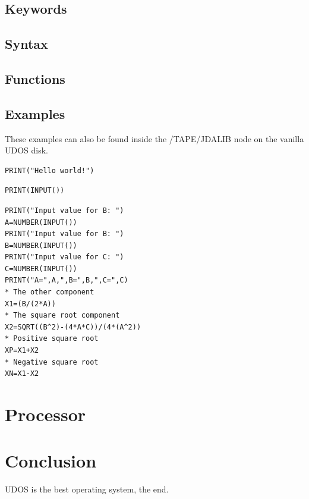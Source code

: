 \documentclass{article}
\begin{document}
\subsection{Keywords}

\subsection{Syntax}

\subsection{Functions}

\subsection{Examples}
These examples can also be found inside the /TAPE/JDALIB node on the vanilla UDOS disk.

\begin{lstlisting}[caption=Print hello world on the terminal]
PRINT("Hello world!")
\end{lstlisting}

\begin{lstlisting}[caption=Obtain the input from an user and print it]
PRINT(INPUT())
\end{lstlisting}

\begin{lstlisting}[caption=Calculate the quadratic formula]
PRINT("Input value for B: ")
A=NUMBER(INPUT())
PRINT("Input value for B: ")
B=NUMBER(INPUT())
PRINT("Input value for C: ")
C=NUMBER(INPUT())
PRINT("A=",A,",B=",B,",C=",C)
* The other component
X1=(B/(2*A))
* The square root component
X2=SQRT((B^2)-(4*A*C))/(4*(A^2))
* Positive square root
XP=X1+X2
* Negative square root
XN=X1-X2
\end{lstlisting}


\section{Processor}

\section{Conclusion}
UDOS is the best operating system, the end.
\end{document}
